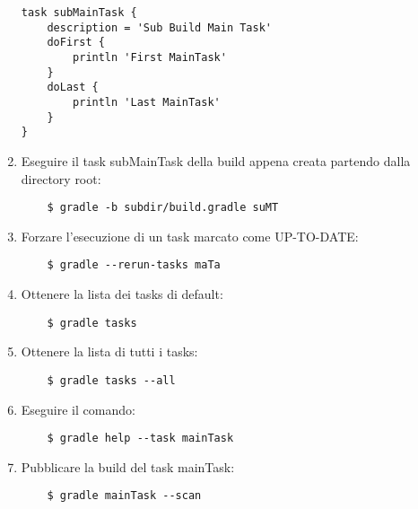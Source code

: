 \begin{enumerate}
\begin{lstlisting}[frame=single]
task subMainTask {
	description = 'Sub Build Main Task'
	doFirst {
		println 'First MainTask'
	}
	doLast {
		println 'Last MainTask'
	}
}
\end{lstlisting}
    \item Eseguire il task subMainTask della build appena creata partendo dalla directory root:
\begin{verbatim}
    $ gradle -b subdir/build.gradle suMT        
\end{verbatim}
    \item Forzare l'esecuzione di un task marcato come UP-TO-DATE:
\begin{verbatim}
    $ gradle --rerun-tasks maTa
\end{verbatim}
    \item Ottenere la lista dei tasks di default:
\begin{verbatim}
    $ gradle tasks
\end{verbatim}
    \item Ottenere la lista di tutti i tasks:
\begin{verbatim}
    $ gradle tasks --all
\end{verbatim}
    \item Eseguire il comando:
\begin{verbatim}
    $ gradle help --task mainTask
\end{verbatim}
    \item Pubblicare la build del task mainTask:
\begin{verbatim}
    $ gradle mainTask --scan
\end{verbatim}
\end{enumerate}